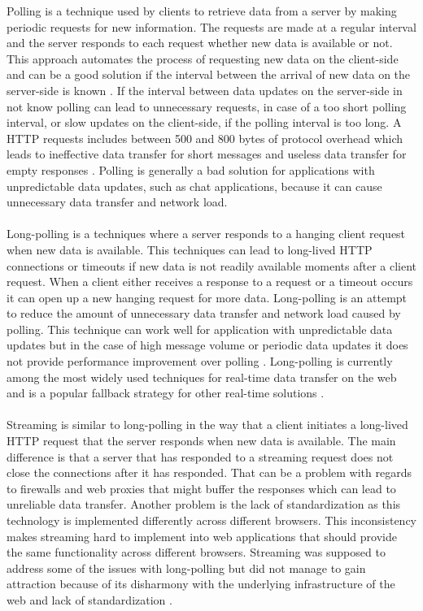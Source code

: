 Polling is a technique used by clients to retrieve data from a server by making periodic requests for new information. The requests are made at a regular interval and the server responds to each request whether new data is available or not. This approach automates the process of requesting new data on the client-side and can be a good solution if the interval between the arrival of new data on the server-side is known \cite{pimentel2012communicating}. If the interval between data updates on the server-side in not know polling can lead to unnecessary requests, in case of a too short polling interval, or slow updates on the client-side, if the polling interval is too long. A HTTP requests includes between 500 and 800 bytes of protocol overhead which leads to ineffective data transfer for short messages and useless data transfer for empty responses \cite{grigorik2013high}. Polling is generally a bad solution for applications with unpredictable data updates, such as chat applications, because it can cause unnecessary data transfer and network load.
\\ \\
Long-polling is a techniques where a server responds to a hanging client request when new data is available. This techniques can lead to long-lived HTTP connections or timeouts if new data is not readily available moments after a client request. When a client either receives a response to a request or a timeout occurs it can open up a new hanging request for more data. Long-polling is an attempt to reduce the amount of unnecessary data transfer and network load caused by polling. This technique can work well for application with unpredictable data updates but in the case of high message volume or periodic data updates it does not provide performance improvement over polling \cite{grigorik2013high}. Long-polling is currently among the most widely used techniques for real-time data transfer on the web and is a popular fallback strategy for other real-time solutions \cite{modernizr}.
\\ \\
Streaming is similar to long-polling in the way that a client initiates a long-lived HTTP request that the server responds when new data is available. The main difference is that a server that has responded to a streaming request does not close the connections after it has responded. That can be a problem with regards to firewalls and web proxies that might buffer the responses which can lead to unreliable data transfer. Another problem is the lack of standardization as this technology is implemented differently across different browsers. This inconsistency makes streaming hard to implement into web applications that should provide the same functionality across different browsers. Streaming was supposed to address some of the issues with long-polling but did not manage to gain attraction because of its disharmony with the underlying infrastructure of the web and lack of standardization \cite{grigorik2013high}.
